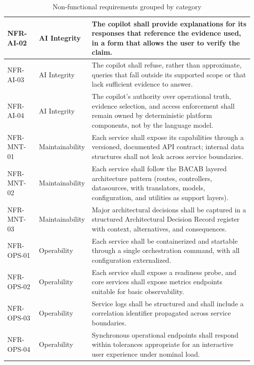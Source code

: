 \begin{table}[H]
\begin{tabular}{|p{2cm}|p{1.6cm}|p{10.4cm}|}
NFR-AI-02 & AI Integrity & The copilot shall provide explanations for its responses that reference the evidence used, in a form that allows the user to verify the claim. \\ \hline
NFR-AI-03 & AI Integrity & The copilot shall refuse, rather than approximate, queries that fall outside its supported scope or that lack sufficient evidence to answer. \\ \hline
NFR-AI-04 & AI Integrity & The copilot's authority over operational truth, evidence selection, and access enforcement shall remain owned by deterministic platform components, not by the language model. \\ \hline
NFR-MNT-01 & Maintainability & Each service shall expose its capabilities through a versioned, documented API contract; internal data structures shall not leak across service boundaries. \\ \hline
NFR-MNT-02 & Maintainability & Each service shall follow the BACAB layered architecture pattern (routes, controllers, datasources, with translators, models, configuration, and utilities as support layers). \\ \hline
NFR-MNT-03 & Maintainability & Major architectural decisions shall be captured in a structured Architectural Decision Record register with context, alternatives, and consequences. \\ \hline
NFR-OPS-01 & Operability & Each service shall be containerized and startable through a single orchestration command, with all configuration externalized. \\ \hline
NFR-OPS-02 & Operability & Each service shall expose a readiness probe, and core services shall expose metrics endpoints suitable for basic observability. \\ \hline
NFR-OPS-03 & Operability & Service logs shall be structured and shall include a correlation identifier propagated across service boundaries. \\ \hline
NFR-OPS-04 & Operability & Synchronous operational endpoints shall respond within tolerances appropriate for an interactive user experience under nominal load. \\ \hline
\end{tabular}
\caption{Non-functional requirements grouped by category}
\label{tab:nfr}
\end{table}

